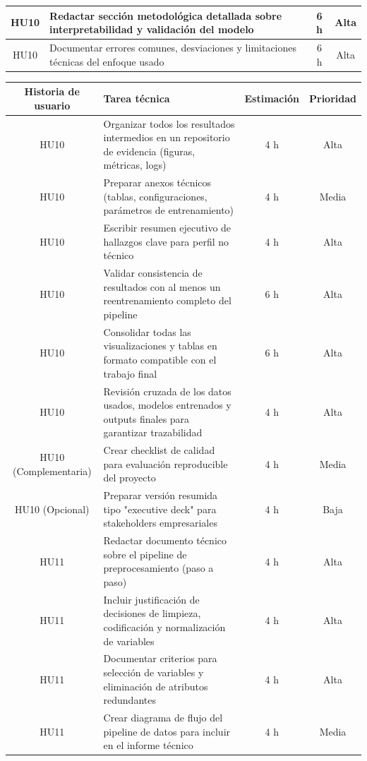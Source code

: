 \documentclass[
11pt, %
]{charter}
\begin{document}
\begin{table}[htpb]
\begin{tabularx}{\linewidth}{@{}|c|X|c|c|@{}}
HU10 & Redactar sección metodológica detallada sobre interpretabilidad y validación del modelo & 6 h & Alta \\ \hline
HU10 & Documentar errores comunes, desviaciones y limitaciones técnicas del enfoque usado & 6 h & Alta \\ \hline


\end{tabularx}
\end{table}

\begin{table}[htpb]
\centering
\begin{tabularx}{\linewidth}{@{}|c|X|c|c|@{}}
\hline
\rowcolor[HTML]{C0C0C0}
Historia de usuario & Tarea técnica & Estimación & Prioridad \\ \hline

HU10 & Organizar todos los resultados intermedios en un repositorio de evidencia (figuras, métricas, logs) & 4 h & Alta \\ \hline
HU10 & Preparar anexos técnicos (tablas, configuraciones, parámetros de entrenamiento) & 4 h & Media \\ \hline
HU10 & Escribir resumen ejecutivo de hallazgos clave para perfil no técnico & 4 h & Alta \\ \hline
HU10 & Validar consistencia de resultados con al menos un reentrenamiento completo del pipeline & 6 h & Alta \\ \hline
HU10 & Consolidar todas las visualizaciones y tablas en formato compatible con el trabajo final & 6 h & Alta \\ \hline
HU10 & Revisión cruzada de los datos usados, modelos entrenados y outputs finales para garantizar trazabilidad & 4 h & Alta \\ \hline


HU10 (Complementaria) & Crear checklist de calidad para evaluación reproducible del proyecto & 4 h & Media \\ \hline
HU10 (Opcional) & Preparar versión resumida tipo "executive deck" para stakeholders empresariales & 4 h & Baja \\ \hline

HU11 & Redactar documento técnico sobre el pipeline de preprocesamiento (paso a paso) & 4 h & Alta \\ \hline
HU11 & Incluir justificación de decisiones de limpieza, codificación y normalización de variables & 4 h & Alta \\ \hline
HU11 & Documentar criterios para selección de variables y eliminación de atributos redundantes & 4 h & Alta \\ \hline
HU11 & Crear diagrama de flujo del pipeline de datos para incluir en el informe técnico & 4 h & Media \\ \hline


\end{tabularx}
\end{table}
\end{document}
